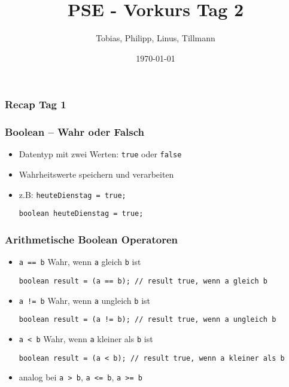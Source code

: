 \documentclass{../../presentation}
\title{PSE - Vorkurs Tag 2}
\author{Tobias, Philipp, Linus, Tillmann}
\institute{FIUS - Fachgruppe Informatik Universität Stuttgart}
\date{\today}
\begin{document}
\begin{frame}
  \titlepage
\end{frame}

\begin{frame}
  \listoftodos
\end{frame}

\begin{frame}
  \frametitle{Recap Tag 1}
\end{frame}



\begin{frame}[fragile]
  \frametitle{Boolean – Wahr oder Falsch}
  \begin{itemize}
    \item Datentyp mit zwei Werten: \texttt{true} oder \texttt{false}
    \item Wahrheitswerte speichern und verarbeiten

    \item z.B: \texttt{heuteDienstag = true;}
          \begin{verbatim}
boolean heuteDienstag = true;
    \end{verbatim}

  \end{itemize}
\end{frame}



\begin{frame}[fragile]
  \frametitle{Arithmetische Boolean Operatoren}


  \begin{itemize}
    \item<1->\texttt{a == b} \quad Wahr, wenn \texttt{a} gleich \texttt{b} ist
          \begin{verbatim}
boolean result = (a == b); // result true, wenn a gleich b
    \end{verbatim}

    \item<2->\texttt{a != b} \quad Wahr, wenn \texttt{a} ungleich \texttt{b} ist
          \begin{verbatim}
boolean result = (a != b); // result true, wenn a ungleich b
    \end{verbatim}

    \item<3->\texttt{a < b} \quad Wahr, wenn \texttt{a} kleiner als \texttt{b} ist
          \begin{verbatim}
boolean result = (a < b); // result true, wenn a kleiner als b
    \end{verbatim}

    \item<4->analog bei \texttt{a > b}, \texttt{a <= b}, \texttt{a >= b} \quad
  \end{itemize}
\end{frame}
\end{document}
